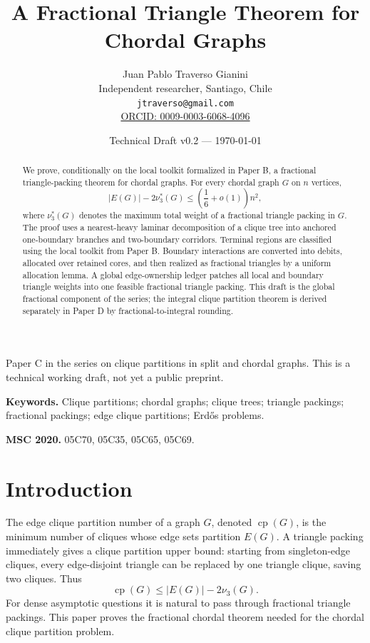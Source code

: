\documentclass[11pt]{article}
\title{A Fractional Triangle Theorem for Chordal Graphs}
\author{
Juan Pablo Traverso Gianini\\
Independent researcher, Santiago, Chile\\
\texttt{jtraverso@gmail.com}\\
\href{https://orcid.org/0009-0003-6068-4096}{ORCID: 0009-0003-6068-4096}
}
\date{Technical Draft v0.2 --- \today}
\theoremstyle{definition}
\newcommand{\cp}{\operatorname{cp}}
\begin{document}
\maketitle

\begin{center}
{\small Paper C in the series on clique partitions in split and chordal graphs. This is a technical working draft, not yet a public preprint.}
\end{center}

\noindent\textbf{Keywords.}
Clique partitions; chordal graphs; clique trees; triangle packings; fractional packings; edge clique partitions; Erdős problems.

\medskip

\noindent\textbf{MSC 2020.}
05C70, 05C35, 05C65, 05C69.

\begin{abstract}
We prove, conditionally on the local toolkit formalized in Paper B, a fractional triangle-packing theorem for chordal graphs. For every chordal graph \(G\) on \(n\) vertices,
\[
    |E(G)|-2\nu_3^*(G)
    \le
    \left(\frac16+o(1)\right)n^2,
\]
where \(\nu_3^*(G)\) denotes the maximum total weight of a fractional triangle packing in \(G\). The proof uses a nearest-heavy laminar decomposition of a clique tree into anchored one-boundary branches and two-boundary corridors. Terminal regions are classified using the local toolkit from Paper B. Boundary interactions are converted into debits, allocated over retained cores, and then realized as fractional triangles by a uniform allocation lemma. A global edge-ownership ledger patches all local and boundary triangle weights into one feasible fractional triangle packing. This draft is the global fractional component of the series; the integral clique partition theorem is derived separately in Paper D by fractional-to-integral rounding.
\end{abstract}

\tableofcontents

\section{Introduction}

The edge clique partition number of a graph \(G\), denoted \(\cp(G)\), is the minimum number of cliques whose edge sets partition \(E(G)\). A triangle packing immediately gives a clique partition upper bound: starting from singleton-edge cliques, every edge-disjoint triangle can be replaced by one triangle clique, saving two cliques. Thus
\[
    \cp(G)\le |E(G)|-2\nu_3(G).
\]
For dense asymptotic questions it is natural to pass through fractional triangle packings. This paper proves the fractional chordal theorem needed for the chordal clique partition problem.
\end{document}
